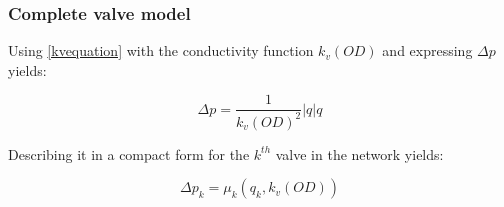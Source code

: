 \subsubsection{Complete valve model}
\label{unittransform}

Using \eqref{kvequation} with the conductivity function $k_v(OD)$ and expressing $\Delta p$ yields: 

\begin{equation}
\label{CompleteValveModel}
 \Delta p = \frac{1}{k_v(OD)^2} |q| q
\end{equation}

Describing it in a compact form for the $k^{th}$ valve in the network yields: 

\begin{equation}
\label{CompactValveModel}
 \Delta p_k = \mu_k(q_k,k_v(OD)) 
\end{equation}





 
 
 